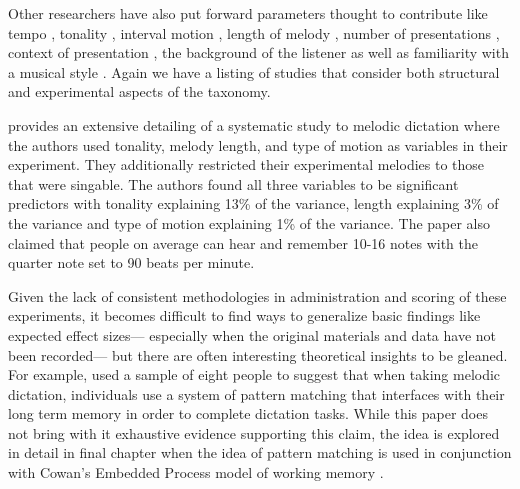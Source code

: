 \documentclass[12pt,]{book}
\begin{document}
Other researchers have also put forward parameters thought to contribute like tempo \citep{hofstetterComputerBaesedRecognitionPerceptual1981}, tonality \citep{dowlingScaleContourTwo1978, longRelationshipsPitchMemory1977, pembrookInterferenceTranscriptionProcess1986, ouraMemoryMelodiesSubjects1988}, interval motion \citep{ortmannTonalDeterminantsMelodic1933, pembrookInterferenceTranscriptionProcess1986}, length of melody \citep{longRelationshipsPitchMemory1977, pembrookInterferenceTranscriptionProcess1986}, number of presentations \citep{hofstetterComputerBaesedRecognitionPerceptual1981, pembrookInterferenceTranscriptionProcess1986},
context of presentation \citep{schellenbergEffectTonalRhythmicContext1985},
the background of the listener \citep{longRelationshipsPitchMemory1977, ouraMemoryMelodiesSubjects1988, schellenbergEffectTonalRhythmicContext1985, taylorStrategiesMemoryShort1983} as well as familiarity with a musical style \citep{schellenbergEffectTonalRhythmicContext1985}.
Again we have a listing of studies that consider both structural and experimental aspects of the taxonomy.

\citet{pembrookInterferenceTranscriptionProcess1986} provides an extensive detailing of a systematic study to melodic dictation where the authors used tonality, melody length, and type of motion as variables in their experiment.
They additionally restricted their experimental melodies to those that were singable.
The authors found all three variables to be significant predictors with tonality explaining 13\% of the variance, length explaining 3\% of the variance and type of motion explaining 1\% of the variance.
The paper also claimed that people on average can hear and remember 10-16 notes with the quarter note set to 90 beats per minute.

Given the lack of consistent methodologies in administration and scoring of these experiments, it becomes difficult to find ways to generalize basic findings like expected effect sizes--- especially when the original materials and data have not been recorded--- but there are often interesting theoretical insights to be gleaned.
For example, \citet{ouraConstructingRepresentationMelody1991a} used a sample of eight people to suggest that when taking melodic dictation, individuals use a system of pattern matching that interfaces with their long term memory in order to complete dictation tasks.
While this paper does not bring with it exhaustive evidence supporting this claim, the idea is explored in detail in final chapter when the idea of pattern matching is used in conjunction with Cowan's Embedded Process model of working memory \citep{cowanEvolvingConceptionsMemory1988}.
\end{document}
